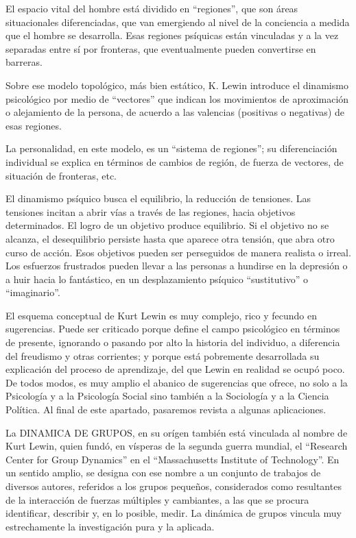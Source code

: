 \documentclass[
]{book}
\begin{document}
El espacio vital del hombre está dividido en ``regiones'', que son áreas situacionales diferenciadas, que van emergiendo al nivel de la conciencia a medida que el hombre se desarrolla. Esas regiones psíquicas están vinculadas y a la vez separadas entre sí por fronteras, que eventualmente pueden convertirse en barreras.

Sobre ese modelo topológico, más bien estático, K. Lewin introduce el dinamismo psicológico por medio de ``vectores'' que indican los movimientos de aproximación o alejamiento de la persona, de acuerdo a las valencias (positivas o negativas) de esas regiones.

La personalidad, en este modelo, es un ``sistema de regiones''; su diferenciación individual se explica en términos de cambios de región, de fuerza de vectores, de situación de fronteras, etc.

El dinamismo psíquico busca el equilibrio, la reducción de tensiones. Las tensiones incitan a abrir vías a través de las regiones, hacia objetivos determinados. El logro de un objetivo produce equilibrio. Si el objetivo no se alcanza, el desequilibrio persiste hasta que aparece otra tensión, que abra otro curso de acción. Esos objetivos pueden ser perseguidos de manera realista o irreal. Los esfuerzos frustrados pueden llevar a las personas a hundirse en la depresión o a huir hacia lo fantástico, en un desplazamiento psíquico ``sustitutivo'' o ``imaginario''.

El esquema conceptual de Kurt Lewin es muy complejo, rico y fecundo en sugerencias. Puede ser criticado porque define el campo psicológico en términos de presente, ignorando o pasando por alto la historia del individuo, a diferencia del freudismo y otras corrientes; y porque está pobremente desarrollada su explicación del proceso de aprendizaje, del que Lewin en realidad se ocupó poco. De todos modos, es muy amplio el abanico de sugerencias que ofrece, no solo a la Psicología y a la Psicología Social sino también a la Sociología y a la Ciencia Política. Al final de este apartado, pasaremos revista a algunas aplicaciones.

La DINAMICA DE GRUPOS, en su orígen también está vinculada al nombre de Kurt Lewin, quien fundó, en vísperas de la segunda guerra mundial, el ``Research Center for Group Dynamics'' en el ``Massachusetts Institute of Technology''. En un sentido amplio, se designa con ese nombre a un conjunto de trabajos de diversos autores, referidos a los grupos pequeños, considerados como resultantes de la interacción de fuerzas múltiples y cambiantes, a las que se procura identificar, describir y, en lo posible, medir. La dinámica de grupos vincula muy estrechamente la investigación pura y la aplicada.
\end{document}
